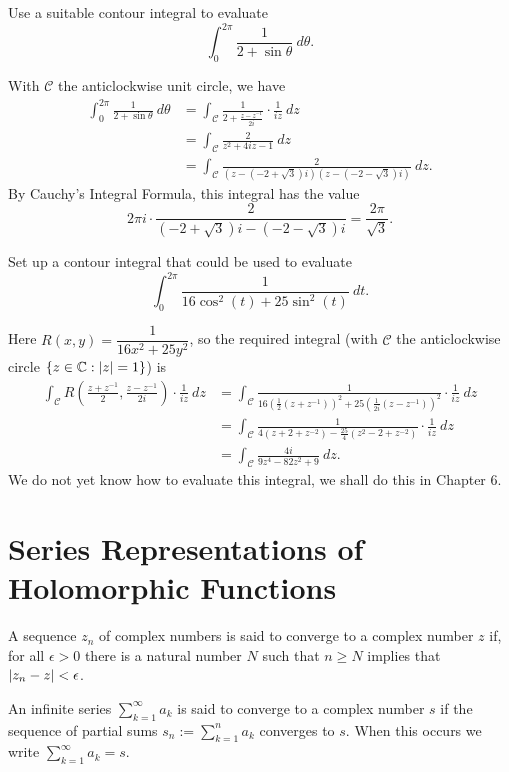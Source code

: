 \begin{example}
Use a suitable contour integral to evaluate
\[
\int_0^{2\pi} \frac{1}{2+\sin \theta}\ d \theta.
\]
\begin{solution}
With $\mathcal{C}$ the anticlockwise unit circle, we have
\begin{align*}
\int_0^{2\pi} \frac{1}{2+\sin \theta}\ d \theta & = \int_{\mathcal{C}} \frac{1}{2+\frac{z-z^{-1}}{2i}} \cdot \frac{1}{iz}\ dz \\
& = \int_{\mathcal{C}} \frac{2}{z^2+4iz-1}\ dz \\
& = \int_{\mathcal{C}} \frac{2}{(z-(-2+\sqrt{3})i)(z-(-2-\sqrt{3})i)}\ dz.
\end{align*}
By Cauchy's Integral Formula, this integral has the value
\[
2\pi i \cdot \frac{2}{(-2+\sqrt{3})i-(-2-\sqrt{3})i} = \frac{2\pi}{\sqrt{3}}.
\]
\end{solution}
\end{example}

\begin{example}
Set up a contour integral that could be used to evaluate
\[
\int_0^{2\pi} \frac{1}{16 \cos^2 (t) + 25 \sin^2 (t)}\ dt.
\]
\begin{solution}
Here $R(x,y) = \dfrac{1}{16x^2+25y^2}$, so the required integral (with $\mathcal{C}$ the anticlockwise circle $\left\{z \in \mathbb{C} : \left| z \right|=1 \right\}$) is
\begin{align*}
\int_{\mathcal{C}} R \left( \frac{z+z^{-1}}{2}, \frac{z-z^{-1}}{2i} \right) \cdot \frac{1}{iz}\ dz & = \int_{\mathcal{C}} \frac{1}{16\left(\frac{1}{2}(z+z^{-1})\right)^2+25\left(\frac{1}{2i}(z-z^{-1}) \right)^2} \cdot \frac{1}{iz}\ dz \\
& = \int_{\mathcal{C}} \frac{1}{4(z+2+z^{-2})-\frac{25}{4}(z^2-2+z^{-2})} \cdot \frac{1}{iz}\ dz \\
& = \int_{\mathcal{C}} \frac{4i}{9z^4-82z^2+9}\ dz.
\end{align*}
We do not yet know how to evaluate this integral, we shall do this in Chapter 6.
\end{solution}
\end{example}


\section{Series Representations of Holomorphic Functions}
\begin{definition}
A sequence $z_n$ of complex numbers is said to converge to a complex number $z$ if, for all $\epsilon>0$ there is a natural number $N$ such that $n \geq N$ implies that $\left| z_n-z \right|<\epsilon$.

An infinite series $\sum_{k=1}^{\infty} a_k$ is said to converge to a complex number $s$ if the sequence of partial sums $s_n:= \sum_{k=1}^n a_k$ converges to $s$.  When this occurs we write $\sum_{k=1}^{\infty} a_k = s$.
\end{definition}

